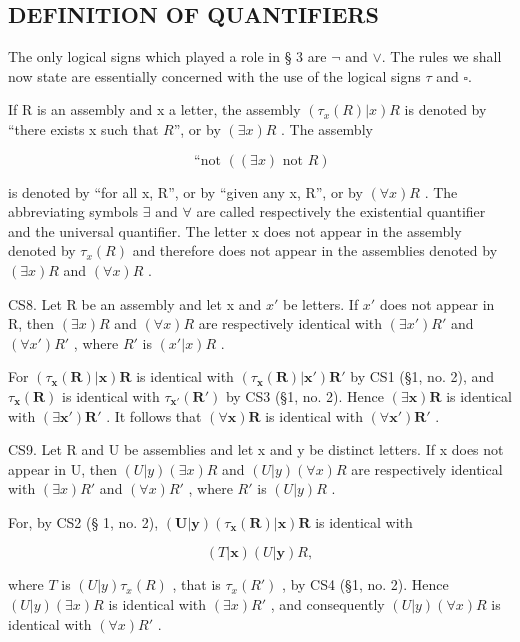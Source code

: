 \subsection{DEFINITION OF QUANTIFIERS}

The only logical signs which played a role in § 3 are \(\neg\) and \(\vee\). The rules we shall now state are essentially concerned with the use of the logical signs \(\tau\) and \(\square\).

If R is an assembly and x a letter, the assembly \((\tau_{x}(R)|x)R\) is denoted by ``there exists x such that \(R\)'', or by \((\exists x)R\) . The assembly

\[
\text {   ``not   } ((\exists x) \text {   not   } R)
\]

is denoted by ``for all x, R'', or by ``given any x, R'', or by \((\forall x)R\) . The abbreviating symbols \(\exists\) and \(\forall\) are called respectively the existential quantifier and the universal quantifier. The letter x does not appear in the assembly denoted by \(\tau_{x}(R)\) and therefore does not appear in the assemblies denoted by \((\exists x)R\) and \((\forall x)R\) .

CS8. Let R be an assembly and let x and \(x'\) be letters. If \(x'\) does not appear in R, then \((\exists x)R\) and \((\forall x)R\) are respectively identical with \((\exists x')R'\) and \((\forall x')R'\) , where \(R'\) is \((x'|x)R\) .

For \((\tau_{\mathbf{x}}(\mathbf{R})|\mathbf{x})\mathbf{R}\) is identical with \((\tau_{\mathbf{x}}(\mathbf{R})|\mathbf{x}')\mathbf{R}'\) by CS1 (§1, no. 2), and \(\tau_{\mathbf{x}}(\mathbf{R})\) is identical with \(\tau_{\mathbf{x}'}(\mathbf{R}')\) by CS3 (§1, no. 2). Hence \((\exists \mathbf{x})\mathbf{R}\) is identical with \((\exists \mathbf{x}')\mathbf{R}'\) . It follows that \((\forall \mathbf{x})\mathbf{R}\) is identical with \((\forall \mathbf{x}')\mathbf{R}'\) .

CS9. Let R and U be assemblies and let x and y be distinct letters. If x does not appear in U, then \((U|y)(\exists x)R\) and \((U|y)(\forall x)R\) are respectively identical with \((\exists x)R'\) and \((\forall x)R'\) , where \(R'\) is \((U|y)R\) .

For, by CS2 (§ 1, no. 2), \((\pmb{U}|\pmb{y})(\tau_{\pmb{x}}(\pmb{R})|\pmb{x})\pmb{R}\) is identical with

\[
(T | \boldsymbol {x}) (U | \boldsymbol {y}) R,
\]

where \(T\) is \((U|y)\tau_x(R)\) , that is \(\tau_x(R')\) , by CS4 (§1, no. 2). Hence \((U|y)(\exists x)R\) is identical with \((\exists x)R'\) , and consequently \((U|y)(\forall x)R\) is identical with \((\forall x)R'\) .

